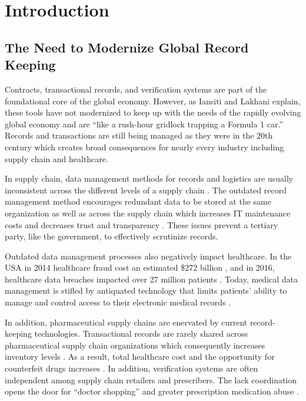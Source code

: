 \documentclass[sigconf]{acmart}
\begin{document}
\section{Introduction}
\subsection{The Need to Modernize Global Record Keeping}
Contracts, transactional records, and verification systems are part of the foundational core of the global economy. However, as Iansiti and Lakhani \cite{hbr} explain, these tools have not modernized to keep up with the needs of the rapidly evolving global economy and are ``like a rush-hour gridlock trapping a Formula 1 car.'' Records and transactions are still being managed as they were in the 20th century which creates broad consequences for nearly every industry including supply chain and healthcare.

In supply chain, data management methods for records and logistics are usually inconsistent across the different levels of a supply chain \cite{arbc4}. The outdated record management method encourages redundant data to be stored at the same organization as well as across the supply chain which increases IT maintenance costs and decreases trust and transparency \cite{arbc1}. These issues prevent a tertiary party, like the government, to effectively scrutinize records. 

Outdated data management processes also negatively impact healthcare. In the USA in 2014 healthcare fraud cost an estimated \$272 billion \cite{economist2014}, and in 2016, healthcare data breaches impacted over 27 million patients \cite{das2017}. Today, medical data management is stifled by antiquated technology that limits patients' ability to manage and control access to their electronic medical records \cite{ekblaw2016medrec}.

In addition, pharmaceutical supply chains are enervated by current record-keeping technologies. Transactional records are rarely shared across pharmaceutical supply chain organizations which consequently increases inventory levels \cite{Nematollahi01}. As a result, total healthcare cost and the opportunity for counterfeit drugs increases \cite{Sahay01}. In addition, verification systems are often independent among supply chain retailers and prescribers. The lack coordination opens the door for ``doctor shopping'' and greater prescription medication abuse \cite{hitchingHealthcare}. 
\end{document}
